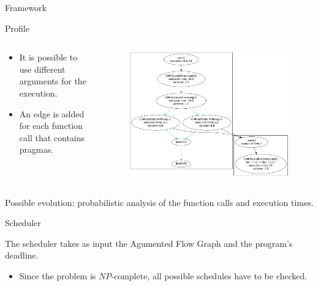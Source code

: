 \documentclass[xcolor=dvipsnames]{beamer}
\begin{document}
\begin{section}{Framework}
\begin{frame}{\hskip 0.3cm Profile}
\begin{columns}
\begin{column}{5cm}
\begin{itemize}
\item It is possible to use different arguments for the execution.

\item An edge is added for each function call that contains pragmas.

\end{itemize}
\end{column}

\begin{column}{7.5cm}
\vskip -0.5cm
\begin{figure}
\centering
\includegraphics[scale=0.22]{call_graph.png}

\end{figure}
\end{column}

\end{columns}

Possible evolution: probabilistic analysis of the function calls and execution times.


\end{frame}








\begin{frame}{\hskip 0.3cm Scheduler }

The scheduler takes as input the Agumented Flow Graph and the program's deadline.

\begin{itemize}

\item Since the problem is $NP$-complete, all possible schedules have to be checked.


\end{itemize}
\end{frame}
\end{section}
\end{document}
